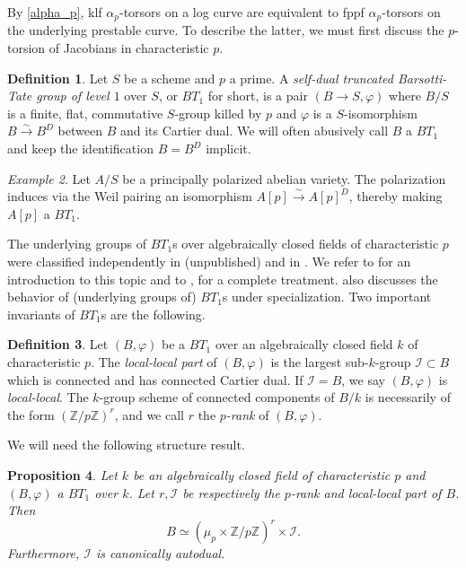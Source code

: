 \documentclass[a4paper,11pt]{amsart} %
\numberwithin{equation}{subsection}
\newcommand{\bb}[1]{{\mathbb{#1}}}
\newcommand{\ca}[1]{{\mathcal{#1}}}
\newcommand{\lra}{\longrightarrow}
\newcommand{\iso}{\stackrel{\sim}{\lra}}
\theoremstyle{definition}
\newtheorem{definition}{Definition}[section]
\theoremstyle{plain}%
\newtheorem{proposition}[definition]{Proposition}
\theoremstyle{remark}
\newtheorem{example}[definition]{Example}
\renewcommand{\phi}{\varphi} %
\begin{document}
By \ref{alpha_p}, klf $\alpha_p$-torsors on a log curve are equivalent to fppf $\alpha_p$-torsors on the underlying prestable curve. To describe the latter, we must first discuss the $p$-torsion of Jacobians in characteristic $p$.

\begin{definition}
    Let $S$ be a scheme and $p$ a prime. A \emph{self-dual truncated Barsotti-Tate group of level $1$} over $S$, or \emph{$BT_1$} for short, is a pair $(B \to S,\phi)$ where $B/S$ is a finite, flat, commutative $S$-group killed by $p$ and $\phi$ is a $S$-isomorphism $B \iso B^D$ between $B$ and its Cartier dual. We will often abusively call $B$ a $BT_1$ and keep the identification $B=B^D$ implicit.
\end{definition}

\begin{example}
    Let $A/S$ be a principally polarized abelian variety. The polarization induces via the Weil pairing an isomorphism $A[p] \iso A[p]^D$, thereby making $A[p]$ a $BT_1$.
\end{example}

The underlying groups of $BT_1$s over algebraically closed fields of characteristic $p$ were classified independently in \cite{kraft1975kommutative} (unpublished) and in \cite{Oort2001}. We refer to \cite{PriesShortGuidepTorsion} for an introduction to this topic and to \cite{Oort2001}, \cite{Moonen2001} for a complete treatment. \cite{Oort2001} also discusses the behavior of (underlying groups of) $BT_1$s under specialization. Two important invariants of $BT_1$s are the following.

\begin{definition}\label{local_local_part_and_p_rank}
    Let $(B,\phi)$ be a $BT_1$ over an algebraically closed field $k$ of characteristic $p$. The \emph{local-local part} of $(B,\phi)$ is the largest sub-$k$-group $\ca I\subset B$ which is connected and has connected Cartier dual. If $\ca I=B$, we say $(B,\phi)$ is \emph{local-local}. The $k$-group scheme of connected components of $B/k$ is necessarily of the form $(\bb Z/p\bb Z)^r$, and we call $r$ the \emph{$p$-rank} of $(B,\phi)$.
\end{definition}

 We will need the following structure result.

\begin{proposition}\label{proposition:BT1s}
    Let $k$ be an algebraically closed field of characteristic $p$ and $(B,\phi)$ a $BT_1$ over $k$. Let $r,\ca I$ be respectively the $p$-rank and local-local part of $B$. Then
    \begin{equation}\label{eqndirectsumdecomp}
        B \simeq (\mu_p \times \bb Z/p\bb Z)^r \times \ca I.
    \end{equation}
    Furthermore, $\ca I$ is canonically autodual.
\end{proposition}
\end{document}
